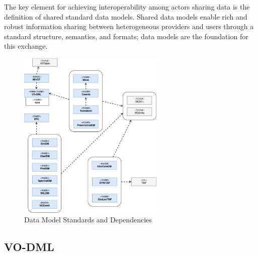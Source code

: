\documentclass[11pt,letter]{ivoa}
\begin{document}
The key element for achieving interoperability among actors sharing data
is the definition
of shared standard data models. Shared data models enable rich and
robust information sharing
between heterogeneous providers and users through a standard structure,
semantics, and formats;
data models are the foundation for this exchange.

\begin{figure}[ht]
\centering
\includegraphics[width=0.62\textwidth]{ivoa-arch-dm.pdf}
\caption{Data Model Standards and Dependencies}
\label{fig:dmdeps}
\end{figure}

\subsection{VO-DML}
\end{document}
